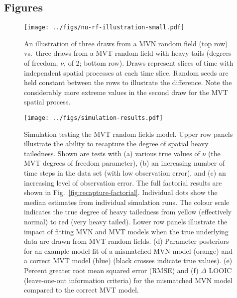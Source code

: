 \documentclass[12pt,english]{article}
\begin{document}
\begin{spacing}{1.9}
\setlength{\bibsep}{0pt plus 0ex}



\clearpage

\section{Figures}

\begin{figure}[htb]
  \begin{center}
    \texttt{[image: ../figs/nu-rf-illustration-small.pdf]}
    \caption{An illustration of three draws from a MVN random field (top row)
      vs.\ three draws from a MVT random field with heavy tails
      (degrees of freedom, $\nu$, of 2; bottom row).
      Draws represent slices of time with independent spatial
      processes at each time slice.
      Random seeds are held constant between the rows
      to illustrate the difference.
      Note the considerably more extreme values in
      the second draw for the MVT spatial process.}
    \label{fig:nu}
  \end{center}
\end{figure}

\clearpage

\begin{figure}[htb]
  \begin{center}
    \texttt{[image: ../figs/simulation-results.pdf]}
    \caption{Simulation testing the MVT random fields model.
      Upper row
      panels illustrate the ability to recapture the
      degree of spatial heavy tailedness.
      Shown are tests with
      (a) various true values of $\nu$ (the MVT degrees of freedom parameter),
      (b) an increasing number of time steps in the data set (with low observation error),
      and (c) an increasing level of observation error.
      The full factorial results are shown in Fig.~\ref{fig:recapture-factorial}.
      Individual dots show the median estimates from individual simulation runs.
      The colour scale indicates the true degree of heavy tailedness from
      yellow (effectively normal) to red (very heavy tailed).
      Lower row panels illustrate the impact of fitting MVN and MVT models
      when the true underlying data are drawn from MVT random fields.
      (d) Parameter posteriors for an
      example model fit of a mismatched MVN model (orange)
      and a correct MVT model (blue) (black crosses indicate true values).
      (e) Percent greater root mean squared error (RMSE)
      and (f) $\Delta$ LOOIC (leave-one-out information criteria)
      for the mismatched MVN model compared to the correct MVT model.
    }
    \label{fig:recapture}
  \end{center}
\end{figure}


\end{spacing}
\end{document}
